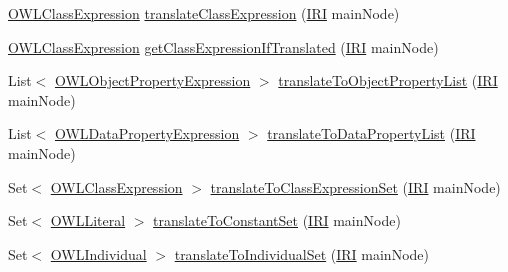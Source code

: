 \begin{DoxyCompactItemize}
\hyperlink{interfaceorg_1_1semanticweb_1_1owlapi_1_1model_1_1_o_w_l_class_expression}{O\-W\-L\-Class\-Expression} \hyperlink{classorg_1_1coode_1_1owlapi_1_1rdfxml_1_1parser_1_1_o_w_l_r_d_f_consumer_a4587e3bb9df224bff1dd7c99764c848f}{translate\-Class\-Expression} (\hyperlink{classorg_1_1semanticweb_1_1owlapi_1_1model_1_1_i_r_i}{I\-R\-I} main\-Node)
\item 
\hyperlink{interfaceorg_1_1semanticweb_1_1owlapi_1_1model_1_1_o_w_l_class_expression}{O\-W\-L\-Class\-Expression} \hyperlink{classorg_1_1coode_1_1owlapi_1_1rdfxml_1_1parser_1_1_o_w_l_r_d_f_consumer_a29c9c88b3db30aa0990f4b0411d5304e}{get\-Class\-Expression\-If\-Translated} (\hyperlink{classorg_1_1semanticweb_1_1owlapi_1_1model_1_1_i_r_i}{I\-R\-I} main\-Node)
\item 
List$<$ \hyperlink{interfaceorg_1_1semanticweb_1_1owlapi_1_1model_1_1_o_w_l_object_property_expression}{O\-W\-L\-Object\-Property\-Expression} $>$ \hyperlink{classorg_1_1coode_1_1owlapi_1_1rdfxml_1_1parser_1_1_o_w_l_r_d_f_consumer_a0844833bb7026b5c7df5f911e9bc5b13}{translate\-To\-Object\-Property\-List} (\hyperlink{classorg_1_1semanticweb_1_1owlapi_1_1model_1_1_i_r_i}{I\-R\-I} main\-Node)
\item 
List$<$ \hyperlink{interfaceorg_1_1semanticweb_1_1owlapi_1_1model_1_1_o_w_l_data_property_expression}{O\-W\-L\-Data\-Property\-Expression} $>$ \hyperlink{classorg_1_1coode_1_1owlapi_1_1rdfxml_1_1parser_1_1_o_w_l_r_d_f_consumer_a18acf9740406d1bd02c8c2957ec44213}{translate\-To\-Data\-Property\-List} (\hyperlink{classorg_1_1semanticweb_1_1owlapi_1_1model_1_1_i_r_i}{I\-R\-I} main\-Node)
\item 
Set$<$ \hyperlink{interfaceorg_1_1semanticweb_1_1owlapi_1_1model_1_1_o_w_l_class_expression}{O\-W\-L\-Class\-Expression} $>$ \hyperlink{classorg_1_1coode_1_1owlapi_1_1rdfxml_1_1parser_1_1_o_w_l_r_d_f_consumer_a2e150e9e36567c81d92ced784d6ded83}{translate\-To\-Class\-Expression\-Set} (\hyperlink{classorg_1_1semanticweb_1_1owlapi_1_1model_1_1_i_r_i}{I\-R\-I} main\-Node)
\item 
Set$<$ \hyperlink{interfaceorg_1_1semanticweb_1_1owlapi_1_1model_1_1_o_w_l_literal}{O\-W\-L\-Literal} $>$ \hyperlink{classorg_1_1coode_1_1owlapi_1_1rdfxml_1_1parser_1_1_o_w_l_r_d_f_consumer_aba71556a16cf3280e45f25703b89357f}{translate\-To\-Constant\-Set} (\hyperlink{classorg_1_1semanticweb_1_1owlapi_1_1model_1_1_i_r_i}{I\-R\-I} main\-Node)
\item 
Set$<$ \hyperlink{interfaceorg_1_1semanticweb_1_1owlapi_1_1model_1_1_o_w_l_individual}{O\-W\-L\-Individual} $>$ \hyperlink{classorg_1_1coode_1_1owlapi_1_1rdfxml_1_1parser_1_1_o_w_l_r_d_f_consumer_acd550035f3b33e6f993fddc1f2cea7d1}{translate\-To\-Individual\-Set} (\hyperlink{classorg_1_1semanticweb_1_1owlapi_1_1model_1_1_i_r_i}{I\-R\-I} main\-Node)

\end{DoxyCompactItemize}
